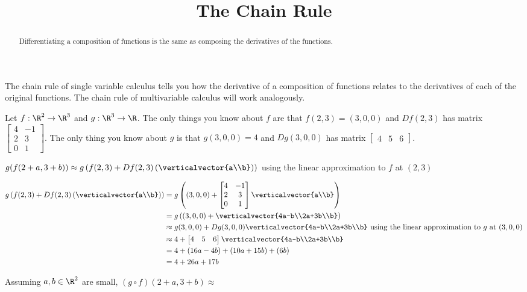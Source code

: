 \documentclass{ximera}
\title{The Chain Rule}
\begin{document}
\begin{abstract}
	Differentiating a composition of functions is the same as composing the derivatives of the functions.
\end{abstract}

The chain rule of single variable calculus tells you how the derivative of a composition of functions relates to the derivatives of each of the original functions.
The chain rule of multivariable calculus will work analogously.

\begin{question}
	Let $f:\R^2 \to \R^3$ and $g:\R^3 \to \R$.  The only things you know about $f$ are that $f(2,3) = (3,0,0)$ and $Df(2,3)$ 
	has matrix \(\begin{bmatrix}  4 & -1 \\2& 3\\ 0 &1\end{bmatrix}\).  The only thing you know about $g$ is that $g(3,0,0) = 4$ and $Dg(3,0,0)$ has matrix
	\(\begin{bmatrix} 4&5&6 \end{bmatrix}\).  
	\begin{solution}
		\begin{hint}
			$g(f(2+a,3+b)) \approx g\left(f(2,3)+Df(2,3)\left(\verticalvector{a\\b}\right)\right)$ using the linear approximation to $f$ at $(2,3)$ 
		\end{hint}
		\begin{hint}
			\begin{align*}
				g\left(f(2,3)+Df(2,3)\left(\verticalvector{a\\b}\right)\right) & = g\left((3,0,0)+\begin{bmatrix}  4 & -1 \\2& 3\\ 0 &1\end{bmatrix} \verticalvector{a\\b}\right)\\
				&= g\left( (3,0,0)+ \verticalvector{4a-b\\2a+3b\\b}\right)\\
				&\approx g(3,0,0)+Dg(3,0,0)\verticalvector{4a-b\\2a+3b\\b} \text{ using the linear approximation to $g$ at $(3,0,0)$}\\
				&\approx 4+\begin{bmatrix} 4&5&6 \end{bmatrix}\verticalvector{4a-b\\2a+3b\\b}\\
				&=4+(16a-4b)+(10a+15b)+(6b)\\
				&=4+26a+17b
			\end{align*}
		\end{hint}
		Assuming $a,b \in \R^2$ are small,  $(g \circ f)(2+a,3+b) \approx$  
	\end{solution}
	

\end{question}
\end{document}
